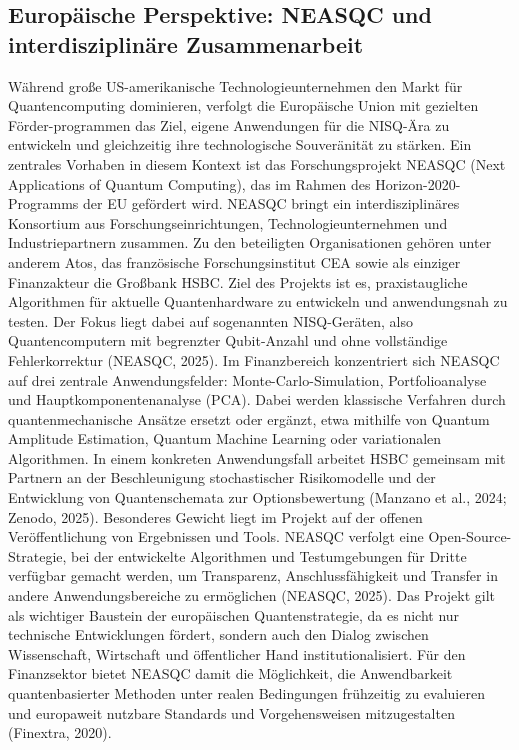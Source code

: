 \subsection{Europäische Perspektive: NEASQC und interdisziplinäre Zusammenarbeit}
Während große US-amerikanische Technologieunternehmen den Markt für Quantencomputing dominieren, verfolgt die Europäische Union mit gezielten Förder-programmen das Ziel, eigene Anwendungen für die NISQ-Ära zu entwickeln und gleichzeitig ihre technologische Souveränität zu stärken. Ein zentrales Vorhaben in diesem Kontext ist das Forschungsprojekt NEASQC (Next Applications of Quantum Computing), das im Rahmen des Horizon-2020-Programms der EU gefördert wird.
NEASQC bringt ein interdisziplinäres Konsortium aus Forschungseinrichtungen, Technologieunternehmen und Industriepartnern zusammen. Zu den beteiligten Organisationen gehören unter anderem Atos, das französische Forschungsinstitut CEA sowie als einziger Finanzakteur die Großbank HSBC. Ziel des Projekts ist es, praxistaugliche Algorithmen für aktuelle Quantenhardware zu entwickeln und anwendungsnah zu testen. Der Fokus liegt dabei auf sogenannten NISQ-Geräten, also Quantencomputern mit begrenzter Qubit-Anzahl und ohne vollständige Fehlerkorrektur (NEASQC, 2025).
Im Finanzbereich konzentriert sich NEASQC auf drei zentrale Anwendungsfelder: Monte-Carlo-Simulation, Portfolioanalyse und Hauptkomponentenanalyse (PCA). Dabei werden klassische Verfahren durch quantenmechanische Ansätze ersetzt oder ergänzt, etwa mithilfe von Quantum Amplitude Estimation, Quantum Machine Learning oder variationalen Algorithmen. In einem konkreten Anwendungsfall arbeitet HSBC gemeinsam mit Partnern an der Beschleunigung stochastischer Risikomodelle und der Entwicklung von Quantenschemata zur Optionsbewertung (Manzano et al., 2024; Zenodo, 2025).
Besonderes Gewicht liegt im Projekt auf der offenen Veröffentlichung von Ergebnissen und Tools. NEASQC verfolgt eine Open-Source-Strategie, bei der entwickelte Algorithmen und Testumgebungen für Dritte verfügbar gemacht werden, um Transparenz, Anschlussfähigkeit und Transfer in andere Anwendungsbereiche zu ermöglichen (NEASQC, 2025).
Das Projekt gilt als wichtiger Baustein der europäischen Quantenstrategie, da es nicht nur technische Entwicklungen fördert, sondern auch den Dialog zwischen Wissenschaft, Wirtschaft und öffentlicher Hand institutionalisiert. Für den Finanzsektor bietet NEASQC damit die Möglichkeit, die Anwendbarkeit quantenbasierter Methoden unter realen Bedingungen frühzeitig zu evaluieren und europaweit nutzbare Standards und Vorgehensweisen mitzugestalten (Finextra, 2020).

